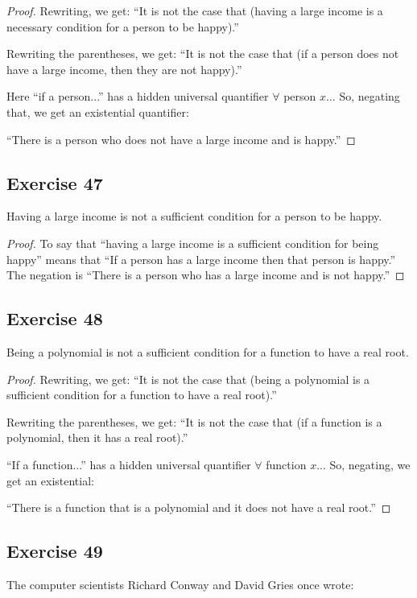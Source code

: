 \documentclass[14pt]{extarticle}
\newcommand{\fa}{\forall}
\begin{document}
\begin{proof}
    Rewriting, we get: ``It is not the case that (having a large income is a necessary condition for a person to be happy).''

    Rewriting the parentheses, we get: ``It is not the case that (if a person does not have a large income, then they are not happy).''

    Here ``if a person...'' has a hidden universal quantifier $\fa$ person $x$... So, negating that, we get an existential quantifier:

    ``There is a person who does not have a large income and is happy.''
\end{proof}

\subsection{Exercise 47}
Having a large income is not a sufficient condition for a person to be happy.

\begin{proof}
    To say that “having a large income is a sufficient condition for being happy” means that “If a person has a
    large income then that person is happy.” The negation
    is “There is a person who has a large income and is not
    happy.”
\end{proof}

\subsection{Exercise 48}
Being a polynomial is not a sufficient condition for a function to have a real root.

\begin{proof}
    Rewriting, we get: ``It is not the case that (being a polynomial is a sufficient condition for a function to have a real root).''

    Rewriting the parentheses, we get: ``It is not the case that (if a function is a polynomial, then it has a real root).''

    ``If a function...'' has a hidden universal quantifier $\fa$ function $x$... So, negating, we get an existential:

    ``There is a function that is a polynomial and it does not have a real root.''
\end{proof}

\subsection{Exercise 49}
The computer scientists Richard Conway and David Gries once wrote:
\end{document}
